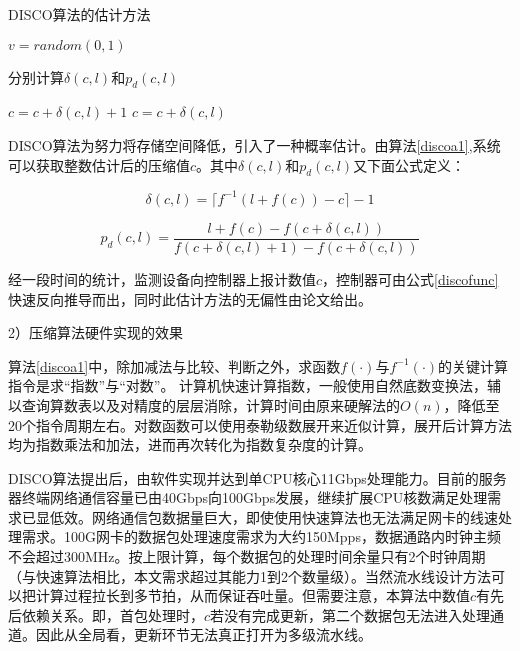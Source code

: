 \begin{algorithm}[ht]
	\caption{DISCO算法的估计方法 \label{discoa1}}
	\IncMargin{2em}
	\DontPrintSemicolon
	$ v = random(0,1) $
	
	分别计算$ \delta(c,l) $和$ p_d(c,l) $
	

	{$ c = c + \delta(c,l) +1 $ }
	{$ c = c + \delta(c,l) $ }
\end{algorithm}

DISCO算法为努力将存储空间降低，引入了一种概率估计。由算法\ref{discoa1},系统可以获取整数估计后的压缩值$c$。其中$ \delta(c,l) $和$ p_d(c,l) $又下面公式定义：

\begin{equation} \label{discofun2}
\delta(c,l)=\lceil f^{-1}(l+f(c)) - c \rceil - 1
\end{equation}

\begin{equation} \label{discofun3}
p_d(c,l) = \dfrac{l+f(c)-f(c+\delta(c,l))}{f(c+\delta(c,l)+1)-f(c+\delta(c,l))}
\end{equation}

经一段时间的统计，监测设备向控制器上报计数值$ c $，控制器可由公式\ref{discofunc}快速反向推导而出，同时此估计方法的无偏性由论文给出。


2）压缩算法硬件实现的效果

算法\ref{discoa1}中，除加减法与比较、判断之外，求函数$ f(\cdot)$与$ f^{-1}(\cdot) $的关键计算指令是求“指数”与“对数”。 计算机快速计算指数，一般使用自然底数变换法，辅以查询算数表以及对精度的层层消除，计算时间由原来硬解法的$ O(n) $，降低至20个指令周期左右。对数函数可以使用泰勒级数展开来近似计算，展开后计算方法均为指数乘法和加法，进而再次转化为指数复杂度的计算。

DISCO算法提出后，由软件实现并达到单CPU核心11Gbps处理能力。目前的服务器终端网络通信容量已由40Gbps向100Gbps发展，继续扩展CPU核数满足处理需求已显低效。网络通信包数据量巨大，即使使用快速算法也无法满足网卡的线速处理需求。100G网卡的数据包处理速度需求为大约150Mpps，数据通路内时钟主频不会超过300MHz。按上限计算，每个数据包的处理时间余量只有2个时钟周期（与快速算法相比，本文需求超过其能力1到2个数量级）。当然流水线设计方法可以把计算过程拉长到多节拍，从而保证吞吐量。但需要注意，本算法中数值$ c $有先后依赖关系。即，首包处理时，$ c $若没有完成更新，第二个数据包无法进入处理通道。因此从全局看，更新环节无法真正打开为多级流水线。

